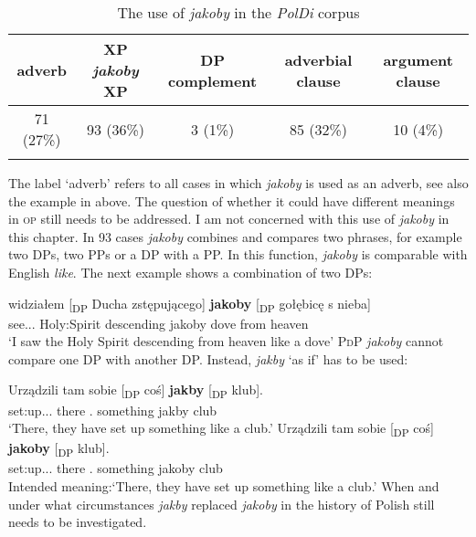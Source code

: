\documentclass[output=paper
,modfonts
,nonflat]{langsci/langscibook}
\begin{document}
\begin{table}[h]  \begin{tabular}{ccccc} 
 \lsptoprule
adverb & XP \emph{jakoby} XP & DP complement  & \newline adverbial clause & argument clause \\
\midrule
 71 (27\%) & 93 (36\%) & 3 (1\%) & 85 (32\%) & 10 (4\%)  \\
 \lspbottomrule
\end{tabular}
\caption{The use of \emph{jakoby} in the \emph{PolDi} corpus} \label{staropolski_statystka}
\end{table}

\noindent The label `adverb' refers to all cases in which \emph{jakoby} is used as an adverb, see also the example in  above. The question of whether it could have different meanings in \textsc{op} still needs to be addressed. I am not concerned with this use of \emph{jakoby} in this chapter. In 93 cases \emph{jakoby} combines and compares two phrases, for example two DPs, two PPs or a DP with a PP. In this function, \emph{jakoby} is comparable with English \emph{like}. The next example shows a combination of two DPs: 

\ea \gll widziałem [\textsubscript{DP} Ducha zstępującego] \textbf{jakoby} [\textsubscript{DP} gołębicę s nieba] \label{pingwin} \\
		see.{\lptcp}.{\masc}.{\firstperson}{\sg} {} {Holy:Spirit} descending jakoby {} dove from heaven \\
\glt	`I saw the Holy Spirit descending from heaven like a dove' 	
\z
\textsc{PdP} \emph{jakoby} cannot compare one DP with another DP. Instead, \emph{jakby} `as if' has to be used:

\ea \ea \gll	Urządzili tam sobie [\textsubscript{DP} coś] \textbf{jakby} \hspace{1,0cm} [\textsubscript{DP} klub]. \\
		set:up.{\lptcp}.{\vir}.{\thirdperson}{\pl} there {}.{\dat} {} something jakby {} {} club \\ 
	\glt	`There, they have set up something like a club.'     
	\ex\gll		*Urządzili tam sobie [\textsubscript{DP} coś] \textbf{jakoby} \hspace{1,0cm} [\textsubscript{DP} klub]. \\
            set:up.{\lptcp}.{\vir}.{\thirdperson}{\pl} there {}.{\dat} {} something jakoby {} {} club \\ 
	\glt	Intended meaning:`There, they have set up something like a club.'	       
    \z\z		
When and under what circumstances \emph{jakby} replaced \emph{jakoby} in the history of Polish still needs to be investigated. 
\end{document}
